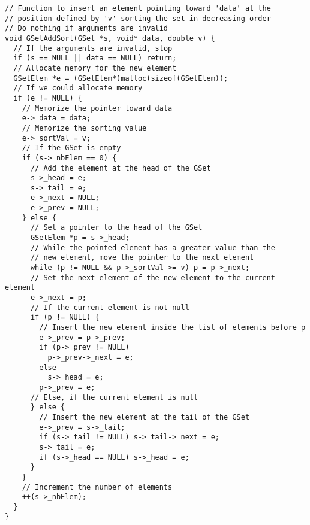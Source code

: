 \documentclass[12pt, a4paper]{article}
\begin{document}
\begin{scriptsize}
\begin{ttfamily}
\begin{lstlisting}
// Function to insert an element pointing toward 'data' at the 
// position defined by 'v' sorting the set in decreasing order
// Do nothing if arguments are invalid
void GSetAddSort(GSet *s, void* data, double v) {
  // If the arguments are invalid, stop
  if (s == NULL || data == NULL) return;
  // Allocate memory for the new element
  GSetElem *e = (GSetElem*)malloc(sizeof(GSetElem));
  // If we could allocate memory
  if (e != NULL) {
    // Memorize the pointer toward data
    e->_data = data;
    // Memorize the sorting value
    e->_sortVal = v;
    // If the GSet is empty
    if (s->_nbElem == 0) {
      // Add the element at the head of the GSet
      s->_head = e;
      s->_tail = e;
      e->_next = NULL;
      e->_prev = NULL;
    } else {
      // Set a pointer to the head of the GSet
      GSetElem *p = s->_head;
      // While the pointed element has a greater value than the 
      // new element, move the pointer to the next element
      while (p != NULL && p->_sortVal >= v) p = p->_next;
      // Set the next element of the new element to the current element
      e->_next = p;
      // If the current element is not null
      if (p != NULL) {
        // Insert the new element inside the list of elements before p
        e->_prev = p->_prev;
        if (p->_prev != NULL) 
          p->_prev->_next = e;
        else
          s->_head = e;
        p->_prev = e;
      // Else, if the current element is null
      } else {
        // Insert the new element at the tail of the GSet
        e->_prev = s->_tail;
        if (s->_tail != NULL) s->_tail->_next = e;
        s->_tail = e;
        if (s->_head == NULL) s->_head = e;
      }
    }
    // Increment the number of elements
    ++(s->_nbElem);
  }
}


\end{lstlisting}
\end{ttfamily}
\end{scriptsize}
\end{document}
